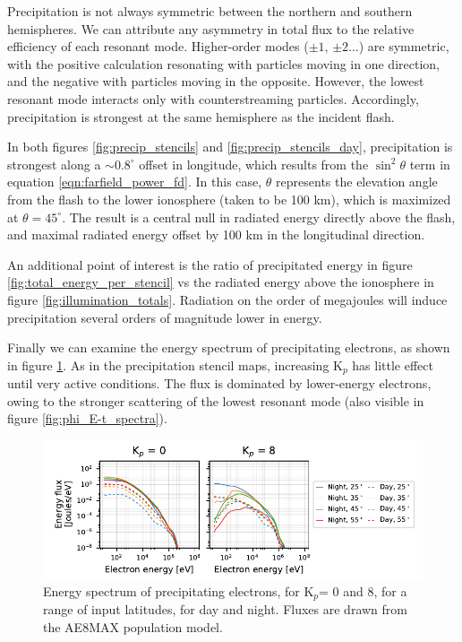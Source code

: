 Precipitation is not always symmetric between the northern and southern hemispheres. We can attribute any asymmetry in total flux to the relative efficiency of each resonant mode. Higher-order modes ($\pm 1$, $\pm 2$...) are symmetric, with the positive calculation resonating with particles moving in one direction, and the negative with particles moving in the opposite. However, the lowest resonant mode interacts only with counterstreaming particles. Accordingly, precipitation is strongest at the same hemisphere as the incident flash.

In both figures \ref{fig:precip_stencils} and \ref{fig:precip_stencils_day}, precipitation is strongest along a $\sim 0.8^\circ$ offset in longitude, which results from the $\sin^2\theta$ term in equation \eqref{eqn:farfield_power_fd}. In this case, $\theta$ represents the elevation angle from the flash to the lower ionosphere (taken to be 100 km), which is maximized at $\theta = 45^\circ$. The result is a central null in radiated energy directly above the flash, and maximal radiated energy offset by 100 km in the longitudinal direction.

An additional point of interest is the ratio of precipitated energy in figure \ref{fig:total_energy_per_stencil} vs the radiated energy above the ionosphere in figure \ref{fig:illumination_totals}. Radiation on the order of megajoules will induce precipitation several orders of magnitude lower in energy. 

Finally we can examine the energy spectrum of precipitating electrons, as shown in figure \ref{fig:stencil_energy_spectrum}. As in the precipitation stencil maps, increasing K$_p$ has little effect until very active conditions. The flux is dominated by lower-energy electrons, owing to the stronger scattering of the lowest resonant mode (also visible in figure \ref{fig:phi_E-t_spectra}).

\begin{figure}[]
\begin{center}
\includegraphics{figures/stencil_energy_spectrum.pdf}
\caption[Energy spectrum of LEP stencils]{Energy spectrum of precipitating electrons, for K$_p$= 0 and 8, for a range of input latitudes, for day and night. Fluxes are drawn from the AE8MAX population model.}
\label{fig:stencil_energy_spectrum}
\end{center}
\end{figure}

